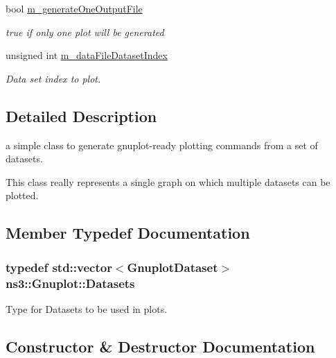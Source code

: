 \begin{DoxyCompactItemize}
bool \hyperlink{classns3_1_1Gnuplot_ad4412600f51935ec7e5d53223f255779}{m\+\_\+generate\+One\+Output\+File}
\begin{DoxyCompactList}\small\item\em true if only one plot will be generated \end{DoxyCompactList}\item 
unsigned int \hyperlink{classns3_1_1Gnuplot_a630bfa2339c364f07c3892a6044ff80f}{m\+\_\+data\+File\+Dataset\+Index}
\begin{DoxyCompactList}\small\item\em Data set index to plot. \end{DoxyCompactList}\end{DoxyCompactItemize}


\subsection{Detailed Description}
a simple class to generate gnuplot-\/ready plotting commands from a set of datasets. 

This class really represents a single graph on which multiple datasets can be plotted. 

\subsection{Member Typedef Documentation}
\subsubsection[{\texorpdfstring{Datasets}{Datasets}}]{\setlength{\rightskip}{0pt plus 5cm}typedef std\+::vector$<${\bf Gnuplot\+Dataset}$>$ {\bf ns3\+::\+Gnuplot\+::\+Datasets}\hspace{0.3cm}{\ttfamily [private]}}\hypertarget{classns3_1_1Gnuplot_a88609830a70d2fb1f1b8f2e8a70cd09d}{}\label{classns3_1_1Gnuplot_a88609830a70d2fb1f1b8f2e8a70cd09d}


Type for Datasets to be used in plots. 



\subsection{Constructor \& Destructor Documentation}
